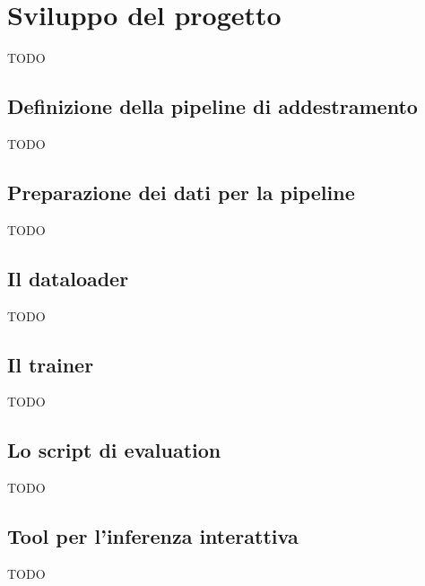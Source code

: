 \chapter{Sviluppo del progetto}
TODO

\section{Definizione della pipeline di addestramento}
TODO

\section{Preparazione dei dati per la pipeline}
TODO

\section{Il dataloader}
TODO

\section{Il trainer}
TODO

\section{Lo script di evaluation}
TODO

\section{Tool per l'inferenza interattiva}
TODO

